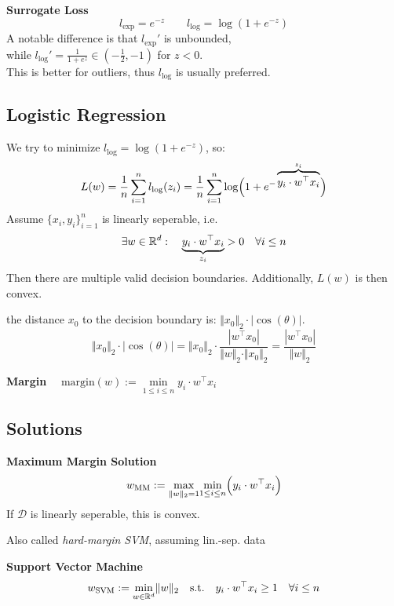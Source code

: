  \textbf{Surrogate Loss}
$$
    l_\text{exp} = e^{-z} \qquad l_\text{log} = \log(1+e^{-z})
$$
A notable difference is that $l_\text{exp}'$ is unbounded,\\
while $l_\text{log}' = \frac{1}{1+e^z} \in (-\frac{1}{2}, -1)$ for $z < 0$.\\
This is better for outliers, thus $l_\text{log}$ is usually preferred.

\newpage
\subsection{Logistic Regression}

We try to minimize $l_\text{log} = \log(1+e^{-z})$, so:
$$
    L(w) = \frac{1}{n}\sum_{i=1}^{n} l_\text{log}(z_i) = \frac{1}{n}\sum_{i=1}^{n}\log\Bigl( 1 + e^{-\overbrace{y_i \cdot w^\top x_i}^{z_i}} \Bigr)
$$
Assume $\{x_i,y_i\}_{i=1}^n$ is linearly seperable, i.e. 
$$
    \exists w \in \mathbb{R}^d:\quad \underbrace{y_i \cdot w^\top x_i}_{z_i} > 0 \quad \forall i \leq n
$$
Then there are multiple valid decision boundaries. Additionally, $L(w)$ is then convex.

the distance $x_0$ to the decision boundary is: $\Vert x_0 \Vert_2 \cdot |\cos(\theta)|$.\\
$$
    \Vert x_0 \Vert_2 \cdot |\cos(\theta)| = \Vert x_0 \Vert_2 \cdot \frac{|w^\top x_0 |}{\Vert w \Vert_2 \cdot \Vert x_0 \Vert_2} = \frac{|w^\top x_0|}{\Vert w \Vert_2}
$$

 \textbf{Margin} $\quad \text{margin}(w) := \underset{1\leq i\leq n}{\min} y_i \cdot w^\top x_i$

\subsection{Solutions}

 \textbf{Maximum Margin Solution}
$$
    w_\text{MM} := \underset{\Vert w \Vert_2=1}{\max} \underset{1\leq i\leq n}{\min} \Bigl( y_i \cdot w^\top x_i \Bigr)
$$
If $\mathcal{D}$ is linearly seperable, this is convex.

{\scriptsize
    \remark Also called \textit{hard-margin SVM}, assuming lin.-sep. data
}

 \textbf{Support Vector Machine}
$$
    w_\text{SVM} := \underset{w \in \mathbb{R}^d}{\min} \Vert w \Vert_2 \quad\text{s.t.}\quad y_i \cdot w^\top x_i \geq 1 \quad \forall i \leq n
$$

